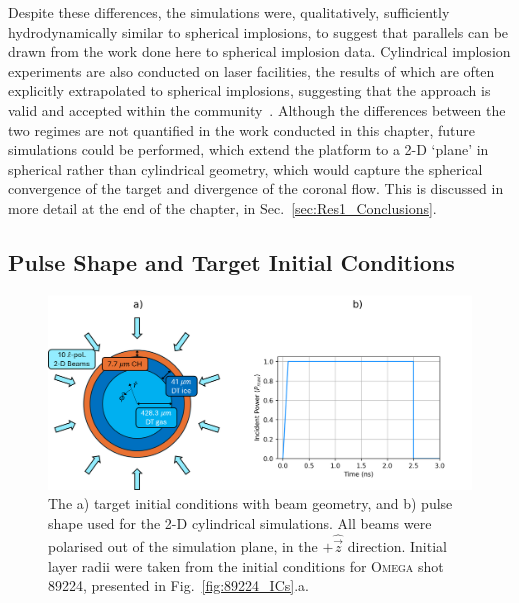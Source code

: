 Despite these differences, the simulations were, qualitatively, sufficiently hydrodynamically similar to spherical implosions, to suggest that parallels can be drawn from the work done here to spherical implosion data.
Cylindrical implosion experiments are also conducted on laser facilities, the results of which are often explicitly extrapolated to spherical implosions, suggesting that the approach is valid and accepted within the community~\cite{perez-callejo_cylindrical_2022,tubbs_directdrive_1999}.
Although the differences between the two regimes are not quantified in the work conducted in this chapter, future simulations could be performed, which extend the platform to a 2-D `plane' in spherical rather than cylindrical geometry, which would capture the spherical convergence of the target and divergence of the coronal flow.
This is discussed in more detail at the end of the chapter, in Sec.~\ref{sec:Res1_Conclusions}.

\subsection{Pulse Shape and Target Initial Conditions}%
\label{sec:Res1_initialconditions}

\begin{figure}[t!]
    \includegraphics[width=\linewidth]{Results1/Images/cyl_setup.png}
    \centering
    \caption{The a) target initial conditions with beam geometry, and b) pulse shape used for the 2-D cylindrical simulations.
    All beams were polarised out of the simulation plane, in the $+\hat{\vec{z}}$ direction.
    Initial layer radii were taken from the initial conditions for \textsc{Omega} shot 89224, presented in Fig.~\ref{fig:89224_ICs}.a.}%
    \label{fig:Res1_cyl_setup}
\end{figure}

